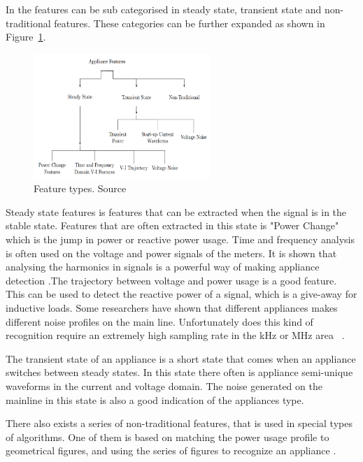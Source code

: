 In  the features can be sub categorised in steady state, transient state and non-traditional features.  These categories can be further expanded as shown in Figure~\ref{fig:FTR}. 

\begin{figure}[H]
\centering
\includegraphics[width=0.6\textwidth]{billeder/featureOverview.png}
\caption[Feature types.]{Feature types. Source \citep{RefWorks:17}}
\label{fig:FTR}
\end{figure}

Steady state features is features that can be extracted when the signal is in the stable state. Features that are often extracted in this state is "Power Change" which is the jump in power or reactive power usage. Time and frequency analysis is often used on the voltage and power signals of the meters. It is shown that analysing the harmonics in signals is a powerful way of making appliance detection \citep{RefWorks:29}.The trajectory between voltage and power usage is a good feature. This can be used to detect the reactive power of a signal, which is a give-away for inductive loads. Some researchers have shown that different appliances makes different noise profiles on the main line. Unfortunately does this kind of recognition require an extremely high sampling rate in the kHz or MHz area~ \citep{RefWorks:30}. 

The transient state of an appliance is a short state that comes when an appliance switches between steady states. In this state there often is appliance semi-unique waveforms in the current and voltage domain. The noise generated on the mainline in this state is also a good indication of the appliances type. 

There also exists a series of non-traditional features, that is used in special types of algorithms. One of them is based on matching the power usage profile to geometrical figures, and using the series of figures to recognize an appliance \citep{RefWorks:17}.  

